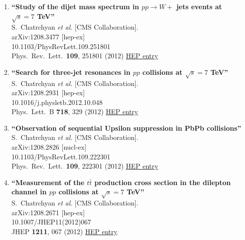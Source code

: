 \documentclass{article}
\begin{document}
\begin{enumerate}
\item%
{\bf ``Study of the dijet mass spectrum in $pp \to W +$ jets events at $\sqrt{s}=7$ TeV''}
  \\{}S.~Chatrchyan {\it et al.} [CMS Collaboration].
  \\{}arXiv:1208.3477 [hep-ex]
    \\{}10.1103/PhysRevLett.109.251801
\\{}Phys.\ Rev.\ Lett.\  {\bf 109}, 251801 (2012) %
\href{http://inspirehep.net/record/1128019}{HEP entry}


\item%
{\bf ``Search for three-jet resonances in $pp$ collisions at $\sqrt{s}=7$ TeV''}
  \\{}S.~Chatrchyan {\it et al.} [CMS Collaboration].
  \\{}arXiv:1208.2931 [hep-ex]
    \\{}10.1016/j.physletb.2012.10.048
\\{}Phys.\ Lett.\ B {\bf 718}, 329 (2012) %
\href{http://inspirehep.net/record/1127510}{HEP entry}


\item%
{\bf ``Observation of sequential Upsilon suppression in PbPb collisions''}
  \\{}S.~Chatrchyan {\it et al.} [CMS Collaboration].
  \\{}arXiv:1208.2826 [nucl-ex]
    \\{}10.1103/PhysRevLett.109.222301
\\{}Phys.\ Rev.\ Lett.\  {\bf 109}, 222301 (2012) %
\href{http://inspirehep.net/record/1127501}{HEP entry}


\item%
{\bf ``Measurement of the $t\bar{t}$ production cross section in the dilepton channel in $pp$ collisions at $\sqrt{s}=7$ TeV''}
  \\{}S.~Chatrchyan {\it et al.} [CMS Collaboration].
  \\{}arXiv:1208.2671 [hep-ex]
    \\{}10.1007/JHEP11(2012)067
\\{}JHEP {\bf 1211}, 067 (2012) %
\href{http://inspirehep.net/record/1127335}{HEP entry}



\end{enumerate}
\end{document}
